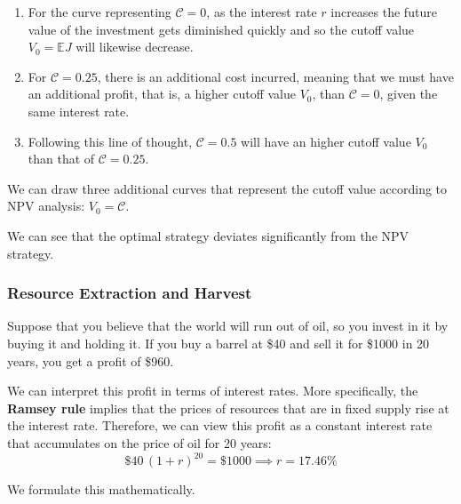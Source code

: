 \documentclass{article}
\begin{document}
      \begin{enumerate}
        \item For the curve representing $\mathcal{C} = 0$, as the interest rate $r$ increases the future value of the investment gets diminished quickly and so the cutoff value $V_0 = \mathbb{E} J$ will likewise decrease. 
        \item For $\mathcal{C} = 0.25$, there is an additional cost incurred, meaning that we must have an additional profit, that is, a higher cutoff value $V_0$, than $\mathcal{C} = 0$, given the same interest rate. 
        \item Following this line of thought, $\mathcal{C} = 0.5$ will have an higher cutoff value $V_0$ than that of $\mathcal{C} = 0.25$. 
      \end{enumerate}
      We can draw three additional curves that represent the cutoff value according to NPV analysis: $V_0 = \mathcal{C}$. 
      \begin{center}
      \end{center}
      We can see that the optimal strategy deviates significantly from the NPV strategy. 

    \subsubsection{Resource Extraction and Harvest}

      \begin{example}
        Suppose that you believe that the world will run out of oil, so you invest in it by buying it and holding it. If you buy a barrel at \$40 and sell it for \$1000 in 20 years, you get a profit of \$960. 

        We can interpret this profit in terms of interest rates. More specifically, the \textbf{Ramsey rule} implies that the prices of resources that are in fixed supply rise at the interest rate. Therefore, we can view this profit as a constant interest rate that accumulates on the price of oil for 20 years: 
        \[\$40 \, (1 + r)^{20} = \$1000 \implies r = 17.46\%\]
      \end{example}

      We formulate this mathematically. 
\end{document}
